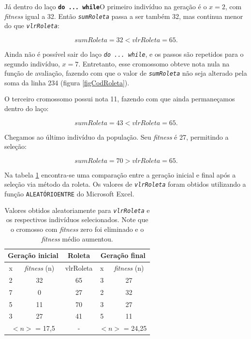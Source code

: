 	Já dentro do laço \textbf{\texttt{do ... while}}O primeiro indivíduo na geração é o $x = 2$, com \textit{fitness} igual a 32. Então \textit{\texttt{sumRoleta}} passa a ser também 32, mas continua menor do que \textit{\texttt{vlrRoleta}}:
	
	$$
		sumRoleta = 32 < vlrRoleta = 65.
	$$
	
	Ainda não é possível sair do laço \textit{\texttt{do ... while}}, e os passos são repetidos para o segundo indivíduo, $x = 7$. Entretanto, esse cromossomo obteve nota nula na função de avaliação, fazendo com que o valor de \textit{\texttt{sumRoleta}} não seja alterado pela soma da linha 234 (figura \ref{figCodRoleta}).
	
	O terceiro cromossomo possui nota 11, fazendo com que ainda permaneçamos dentro do laço:
	
	$$
		sumRoleta = 43 < vlrRoleta = 65.
	$$
	
	Chegamos ao último indivíduo da população. Seu \textit{fitness} é 27, permitindo a seleção:
	
	$$
		sumRoleta = 70 > vlrRoleta = 65.
	$$
	
	Na tabela \ref{tabRoletaManual} encontra-se uma comparação entre a geração inicial e final após a seleção via método da roleta. Os valores de \textit{\texttt{vlrRoleta}} foram obtidos utilizando a função \texttt{ALEATÓRIOENTRE} do Microsoft Excel.
	
\begin{table}[htp]
	\caption{\label{tabRoletaManual}Valores obtidos aleatoriamente para \textit{\texttt{vlrRoleta}} e os respectivos indivíduos selecionados. Note que o cromosso com \textit{fitness} zero foi eliminado e o \textit{fitness} médio aumentou.}
	\begin{center}
		\begin{tabular}{c|c|c|c|c}
			\hline
			\multicolumn{2}{c|}{\textbf{Geração inicial}} & \textbf{Roleta}& \multicolumn{2}{c}{\textbf{Geração final}}  \\
			\hline
			x 					& \textit{fitness} (n)	& vlrRoleta						& x						& \textit{fitness} (n)	\\
			\hline
			2 					& 32										& 65 									& 3						&	27   \\
			7 					& 0 										& 27 									& 2						&	32\\
			5 					& 11										& 70 									& 3						&	27\\	
			3 					& 27										& 41 									& 5						&	11\\
			\hline
			\multicolumn{2}{c|}{$<n>$ = 17,5} & - & \multicolumn{2}{c}{$<n>$ = 24,25}  \\
			\hline
		\end{tabular}
	\end{center}
\end{table}
	
